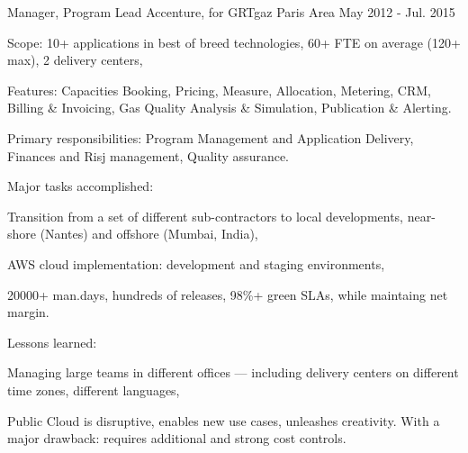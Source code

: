\begin{cventries}
  \cventry
    {Manager, Program Lead} %
    {Accenture, for GRTgaz} %
    {Paris Area} %
    {May 2012 - Jul. 2015} %
    {
      \begin{cvitems} %
        \item {Scope: 10+ applications in best of breed technologies, 60+ FTE on average (120+ max), 2 delivery centers,}
        \item {Features: Capacities Booking, Pricing, Measure, Allocation, Metering, CRM, Billing \& Invoicing, Gas Quality Analysis \& Simulation, Publication \& Alerting.}
        \item {Primary responsibilities: Program Management and Application Delivery, Finances and Risj management, Quality assurance.}
        \item {Major tasks accomplished:}
        \begin{cvsubitems}
          \item {Transition from a set of different sub-contractors to local developments, near-shore (Nantes) and offshore (Mumbai, India),}
          \item {AWS cloud implementation: development and staging environments,}
          \item {20000+ man.days, hundreds of releases, 98\%+ green SLAs, while maintaing net margin.}
        \end{cvsubitems}
        \item {Lessons learned:}
        \begin{cvsubitems}
          \item {Managing large teams in different offices --- including delivery centers on different time zones, different languages,}
          \item {Public Cloud is disruptive, enables new use cases, unleashes creativity. With a major drawback: requires additional and strong cost controls.}
        \end{cvsubitems}
      \end{cvitems}
    }


\end{cventries}
